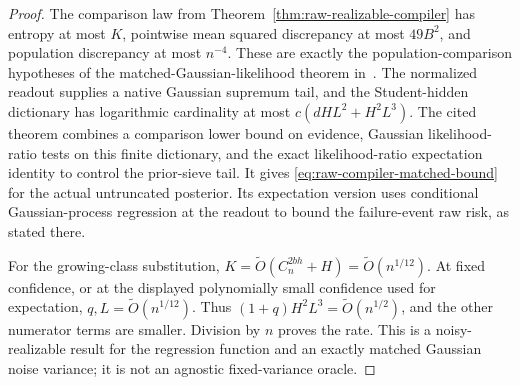 \begin{proof}
The comparison law from Theorem~\ref{thm:raw-realizable-compiler} has
entropy at most $K$, pointwise mean squared discrepancy at most $49B^2$,
and population discrepancy at most $n^{-4}$.  These are exactly the
population-comparison hypotheses of the matched-Gaussian-likelihood
theorem in~\cite{rawprior}.  The normalized readout supplies a native
Gaussian supremum tail, and the Student-hidden dictionary has logarithmic
cardinality at most $c(dHL^2+H^2L^3)$.  The cited theorem combines a
comparison lower bound on evidence, Gaussian likelihood-ratio tests on
this finite dictionary, and the exact likelihood-ratio expectation
identity to control the prior-sieve tail.  It gives
\eqref{eq:raw-compiler-matched-bound} for the actual untruncated posterior.
Its expectation version uses conditional Gaussian-process regression at
the readout to bound the failure-event raw risk, as stated there.

For the growing-class substitution,
$K=\widetilde O(C_n^{2bh}+H)=\widetilde O(n^{1/12})$.
At fixed confidence, or at the displayed polynomially small confidence
used for expectation, $q,L=\widetilde O(n^{1/12})$.
Thus $(1+q)H^2L^3=\widetilde O(n^{1/2})$, and the other numerator terms
are smaller.  Division by $n$ proves the rate.  This is a noisy-realizable
result for the regression function and an exactly matched Gaussian noise
variance; it is not an agnostic fixed-variance oracle.
\end{proof}

